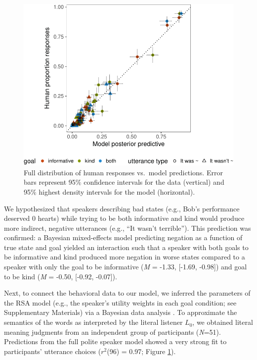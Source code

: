 \documentclass[12pt]{article}
\begin{document}

\begin{figure}
\centering
\includegraphics{polite_manuscript_files/figure-latex/variance-1.pdf}
\caption{\label{fig:variance}Full distribution of human responses vs.~model
predictions. Error bars represent 95\% confidence intervals for the data
(vertical) and 95\% highest density intervals for the model
(horizontal).}
\end{figure}

We hypothesized that speakers describing bad
states (e.g., Bob's performance deserved 0 hearts) while trying to be both
informative and kind would produce more indirect, negative utterances
(e.g., \enquote{It wasn't terrible}).
This prediction was confirmed: a Bayesian mixed-effects
model predicting negation as a function of true state and goal yielded
an interaction such that a speaker with both goals to be informative and
kind produced more negation in worse states compared to a speaker with
only the goal to be informative (\emph{M} = -1.33, {[}-1.69, -0.98{]})
and goal to be kind (\emph{M} = -0.50, {[}-0.92, -0.07{]}).

Next, to connect the behavioral data to our model, we inferred the parameters of the RSA model (e.g., the speaker's utility weights in each goal condition; see Supplementary Materials) via a Bayesian data analysis \cite{lee2014}.
To approximate the semantics of the words as interpreted by the literal listener \(L_0\), we obtained literal meaning judgments from an independent group of participants (\emph{N}=51).
Predictions from the full polite speaker model showed a very strong fit to participants' utterance choices (\(r^2\)(96) = 0.97; Figure \ref{fig:variance}).
\end{document}
